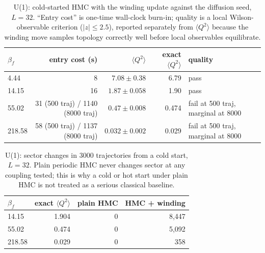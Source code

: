 \begin{table}[htbp]
\centering
\caption{U(1): cold-started HMC with the winding update against the
diffusion seed, $L=32$. ``Entry cost'' is one-time wall-clock burn-in;
quality is a local Wilson-observable criterion ($|z|\le 2.5$), reported
separately from $\langle Q^2\rangle$ because the winding move samples
topology correctly well before local observables equilibrate.}
\label{tab:u1_h2h}
\begin{tabular}{lrrrl}
\toprule
$\beta_f$ & entry cost (s) & $\langle Q^2\rangle$ & exact $\langle Q^2\rangle$ & quality \\
\midrule
4.44   & 8                        & $7.08 \pm 0.38$  & 6.79  & pass \\
14.15  & 16                       & $1.87 \pm 0.058$ & 1.90  & pass \\
55.02  & 31 (500 traj) / 1140 (8000 traj) & $0.47 \pm 0.008$ & 0.474 & fail at 500 traj, marginal at 8000 \\
218.58 & 58 (500 traj) / 1137 (8000 traj) & $0.032 \pm 0.002$ & 0.029 & fail at 500 traj, marginal at 8000 \\
\bottomrule
\end{tabular}
\end{table}

\begin{table}[htbp]
\centering
\caption{U(1): sector changes in 3000 trajectories from a cold start,
$L=32$. Plain periodic HMC never changes sector at any coupling tested;
this is why a cold or hot start under plain HMC is not treated as a
serious classical baseline.}
\label{tab:u1_frozen}
\begin{tabular}{lrrr}
\toprule
$\beta_f$ & exact $\langle Q^2\rangle$ & plain HMC & HMC + winding \\
\midrule
14.15  & 1.904 & 0 & 8{,}447 \\
55.02  & 0.474 & 0 & 5{,}092 \\
218.58 & 0.029 & 0 & 358 \\
\bottomrule
\end{tabular}
\end{table}


